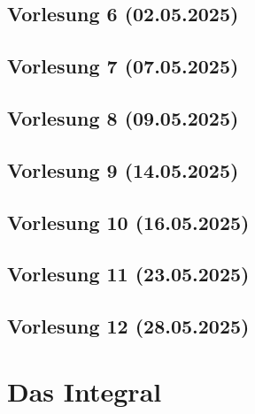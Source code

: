 \documentclass[9pt]{article} %
\begin{document}
\subsection{Vorlesung 6 (02.05.2025)}

\subsection{Vorlesung 7 (07.05.2025)}

\subsection{Vorlesung 8 (09.05.2025)}

\subsection{Vorlesung 9 (14.05.2025)}

\subsection{Vorlesung 10 (16.05.2025)}

\subsection{Vorlesung 11 (23.05.2025)}

\subsection{Vorlesung 12 (28.05.2025)}

\section{Das Integral}
\end{document}
